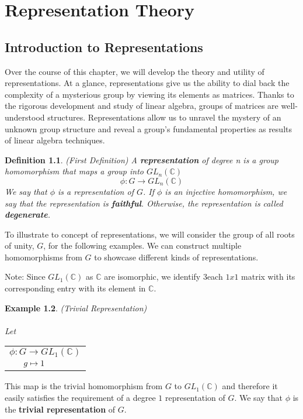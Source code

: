 \documentclass[10pt]{ucthesis}
\newtheorem{definition}{Definition}[chapter]
\newtheorem{example}[definition]{Example}
\begin{document}





\chapter{Representation Theory}

\section{Introduction to Representations}

Over the course of this chapter, we will develop the theory and utility of representations. At a glance, representations give us the ability to dial back the complexity of a mysterious group by viewing its elements as matrices. Thanks to the rigorous development and study of linear algebra, groups of matrices are well-understood structures. Representations allow us to unravel the mystery of an unknown group structure and reveal a group's fundamental properties as results of linear algebra techniques. 

\begin{definition}
	(First Definition) A \textbf{representation} of degree n is a group homomorphism that maps a group into $GL_n(\mathbb{C})$
	$$\phi:G\rightarrow GL_n(\mathbb{C})$$
	We say that $\phi$ is a representation of $G$. If $\phi$ is an injective homomorphism, we say that the representation is \textbf{faithful}. Otherwise, the representation is called \textbf{degenerate}.
\end{definition}

To illustrate to concept of representations, we will consider the group of all roots of unity, $G$, for the following examples. We can construct multiple homomorphisms from $G$ to showcase different kinds of representations. 

\noindent Note: Since $GL_1(\mathbb{C})$ as $\mathbb{C}$ are isomorphic, we identify 3each $1x1$ matrix with its corresponding entry with its element in $\mathbb{C}$.

\begin{example}
	(Trivial Representation)\\\\
	\renewcommand{\arraystretch}{0.7}
	Let   \begin{tabular}{l}$\phi:G\rightarrow GL_1(\mathbb{C})$\\
		$\hspace{6mm}g\mapsto 1$
		\end{tabular}
\end{example}
\noindent This map is the trivial homomorphism from $G$ to $GL_1(\mathbb{C})$ and therefore it easily satisfies the requirement of a degree $1$ representation of $G$. We say that $\phi$ is the \textbf{trivial representation} of $G$.
\end{document}
